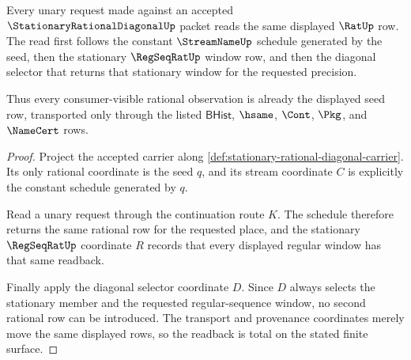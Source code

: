 \begin{theorem}
\label{thm:stationary-rational-diagonal-constant-window-totality}
Every unary request made against an accepted $\StationaryRationalDiagonalUp$
packet reads the same displayed $\RatUp$ row. The read first follows the
constant $\StreamNameUp$ schedule generated by the seed, then the stationary
$\RegSeqRatUp$ window row, and then the diagonal selector that returns that
stationary window for the requested precision.

Thus every consumer-visible rational observation is already the displayed seed
row, transported only through the listed $\mathsf{BHist}$, $\hsame$, $\Cont$,
$\Pkg$, and $\NameCert$ rows.
\end{theorem}
\begin{proof}
Project the accepted carrier along
\autoref{def:stationary-rational-diagonal-carrier}. Its only rational coordinate
is the seed $q$, and its stream coordinate $C$ is explicitly the constant
schedule generated by $q$.

Read a unary request through the continuation route $K$. The schedule therefore
returns the same rational row for the requested place, and the stationary
$\RegSeqRatUp$ coordinate $R$ records that every displayed regular window has
that same readback.

Finally apply the diagonal selector coordinate $D$. Since $D$ always selects the
stationary member and the requested regular-sequence window, no second rational
row can be introduced. The transport and provenance coordinates merely move the
same displayed rows, so the readback is total on the stated finite surface.
\end{proof}

